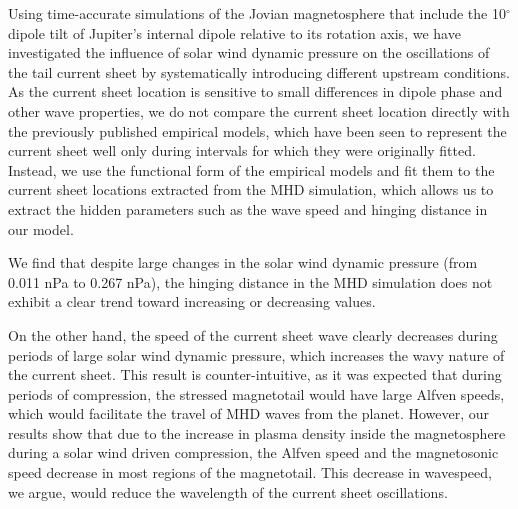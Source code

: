 Using time-accurate simulations of the Jovian magnetosphere that include the 10$^\circ$ dipole tilt of Jupiter's internal dipole relative to its rotation axis, we have investigated the influence of solar wind dynamic pressure on the oscillations of the tail current sheet by systematically introducing different upstream conditions. As the current sheet location is sensitive to small differences in dipole phase and other wave properties, we do not compare the current sheet location directly with the previously published empirical models, which have been seen to represent the current sheet well only during intervals for which they were originally fitted. Instead, we use the functional form of the empirical models and fit them to the current sheet locations extracted from the MHD simulation, which allows us to extract the hidden parameters such as the wave speed and hinging distance in our model. 

We find that despite large changes in the solar wind dynamic pressure (from 0.011 nPa to 0.267 nPa), the hinging distance in the MHD simulation does not exhibit a clear trend toward increasing or decreasing values. 

On the other hand, the speed of the current sheet wave clearly decreases during periods of large solar wind dynamic pressure, which increases the wavy nature of the current sheet. This result is counter-intuitive, as it was expected that during periods of compression, the stressed magnetotail would have large Alfven speeds, which would facilitate the travel of MHD waves from the planet. However, our results show that due to the increase in plasma density inside the magnetosphere during a solar wind driven compression, the Alfven speed and the magnetosonic speed decrease in most regions of the magnetotail. This decrease in wavespeed, we argue, would reduce the wavelength of the current sheet oscillations. 
